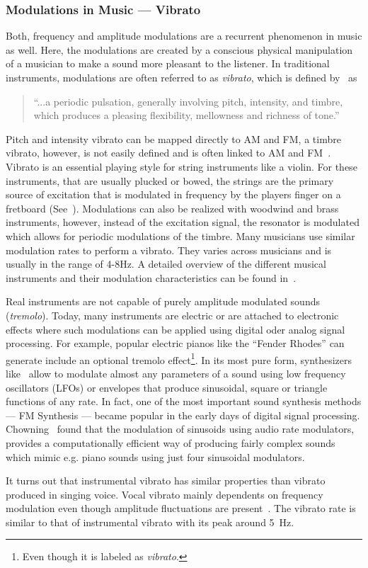 \subsubsection*{Modulations in Music --- Vibrato}

Both, frequency and amplitude modulations are a recurrent phenomenon in music as well.
Here, the modulations are created by a conscious physical manipulation of a musician to make a sound more pleasant to the listener.
In traditional instruments, modulations are often referred to as \emph{vibrato}, which is defined by~\cite{seashore31} as

\begin{quote}
``...a periodic pulsation, generally involving pitch, intensity, and timbre, which produces a pleasing flexibility, mellowness and richness of tone.''
\end{quote}

Pitch and intensity vibrato can be mapped directly to AM and FM, a timbre vibrato, however, is not easily defined and is often linked to AM and FM~\cite{desain99}.
Vibrato is an essential playing style for string instruments like a violin. 
For these instruments, that are usually plucked or bowed, the strings are the primary source of excitation that is modulated in frequency by the players finger on a fretboard (See~\cite{macleod06}).
Modulations can also be realized with woodwind and brass instruments, however, instead of the excitation signal, the resonator is modulated which allows for periodic modulations of the timbre.
Many musicians use similar modulation rates to perform a vibrato.
They varies across musicians and is usually in the range of 4-8\si{\hertz}.
A detailed overview of the different musical instruments and their modulation characteristics can be found in~\cite{fletcher01}.
\par
Real instruments are not capable of purely amplitude modulated sounds (\emph{tremolo}). 
Today, many instruments are electric or are attached to electronic effects where such modulations can be applied using digital oder analog signal processing.
For example, popular electric pianos like the ``Fender Rhodes'' can generate include an optional tremolo effect\footnote{Even though it is labeled as \emph{vibrato}.}.
In its most pure form, synthesizers like~\cite{pinch09, buchla05} allow to modulate almost any parameters of a sound using low frequency oscillators (LFOs) or envelopes that produce sinusoidal, square or triangle functions of any rate.
In fact, one of the most important sound synthesis methods --- FM Synthesis --- became popular in the early days of digital signal processing. 
Chowning~\cite{chowning73} found that the modulation of sinusoids using audio rate modulators, provides a computationally efficient way of producing fairly complex sounds which mimic e.g. piano sounds using just four sinusoidal modulators.
\par
It turns out that instrumental vibrato has similar properties than vibrato produced in singing voice.
Vocal vibrato mainly dependents on frequency modulation even though amplitude fluctuations are present~\cite{sundberg94}. 
The vibrato rate is similar to that of instrumental vibrato with its peak around 5~\si{\hertz}.

